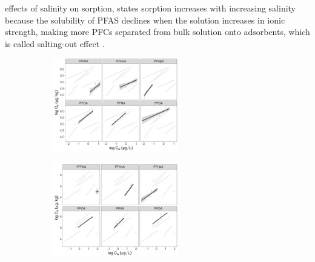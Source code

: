 \citep{yin2022insights,du2014adsorption} effects of salinity on sorption, states sorption increases with increasing salinity because the solubility of PFAS declines when the solution increases in ionic strength, making more PFCs separated from bulk solution onto adsorbents, which is called salting-out effect . 

\begin{figure}
    \centering
        \begin{subfigure}[]{\linewidth}
            \centering
            \includegraphics[width=0.6\textwidth]{R/figs/ULS_facet_isotherm.pdf}
            \label{fig:ULS_isotherm}
        \end{subfigure}
        \begin{subfigure}[]{\linewidth}
            \centering
            \includegraphics[width=0.6\textwidth]{R/figs/DSL_facet_isotherm.pdf}
            \label{fig:DSL_isotherm}
        \end{subfigure}   
\end{figure}
